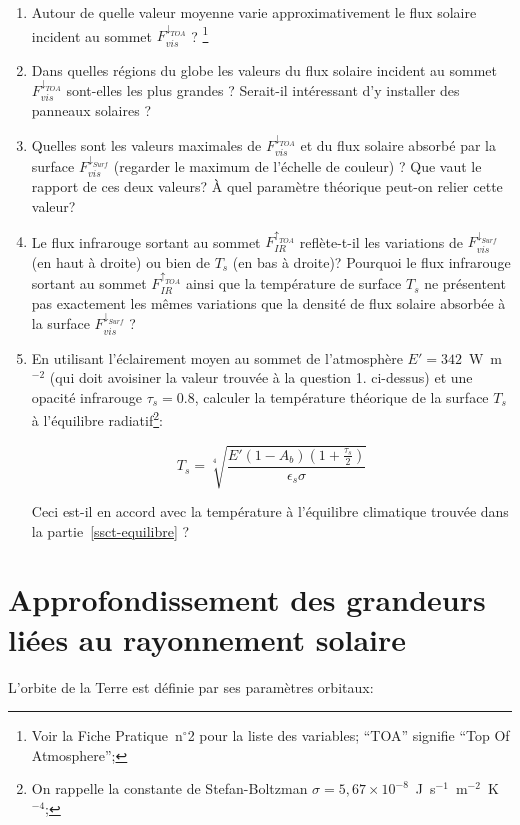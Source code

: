 \documentclass[a4paper,12pt]{article}
\begin{document}
\begin{enumerate}
\item Autour de quelle valeur moyenne varie approximativement le flux solaire
incident au sommet $F_{vis}^{\downarrow_{TOA}}$ ? \footnote{Voir la Fiche
Pratique~n$^\circ$2 pour la liste des variables; ``TOA'' signifie ``Top Of
Atmosphere'';}
\item Dans quelles régions du globe les valeurs du flux solaire incident au
sommet $F_{vis}^{\downarrow_{TOA}}$ sont-elles les plus grandes ? Serait-il
intéressant d'y installer des panneaux solaires ?
\item Quelles sont les valeurs maximales de $F_{vis}^{\downarrow_{TOA}}$ et du
flux solaire absorbé par la surface $F_{vis}^{\downarrow_{Surf}}$ (regarder le
maximum de l'échelle de couleur) ? Que vaut le rapport de ces deux valeurs? \`A
quel paramètre théorique peut-on relier cette valeur?
\item Le flux infrarouge sortant au sommet $F_{IR}^{\uparrow_{TOA}}$
reflète-t-il les variations de $F_{vis}^{\downarrow_{Surf}}$ (en haut à droite)
ou bien de $T_s$ (en bas à droite)? Pourquoi le flux infrarouge sortant au
sommet $F_{IR}^{\uparrow_{TOA}}$ ainsi que la température de surface $T_s$ ne
présentent pas exactement les mêmes variations que la densité de flux solaire
absorbée à la surface $F_{vis}^{\downarrow_{Surf}}$ ?
\item En utilisant l'éclairement moyen au sommet de l'atmosphère $E'=342$~W~m$^
{-2}$ (qui doit avoisiner la valeur trouvée à la question 1. ci-dessus) et une
opacité infrarouge $\tau_s = 0.8$, calculer la température théorique de la
surface $T_s$ à l'équilibre radiatif\footnote{On rappelle la constante de
Stefan-Boltzman $\sigma = 5,67\times 10^{-8}$~J~s$^{-1}$~m$^{-2}$~K$^{-4}$;}:

\begin{equation}
T_s = \sqrt[4]{\frac{E'(1-A_b)(1+\frac{\tau_s}{2})}{\epsilon_s \sigma}}
\end{equation}

Ceci est-il en accord avec la température à l'équilibre climatique trouvée dans
la
partie~\ref{ssct-equilibre} ?
\end{enumerate}

\section{Approfondissement des grandeurs liées au rayonnement solaire}

L'orbite de la Terre est définie par ses paramètres orbitaux:
\end{document}
